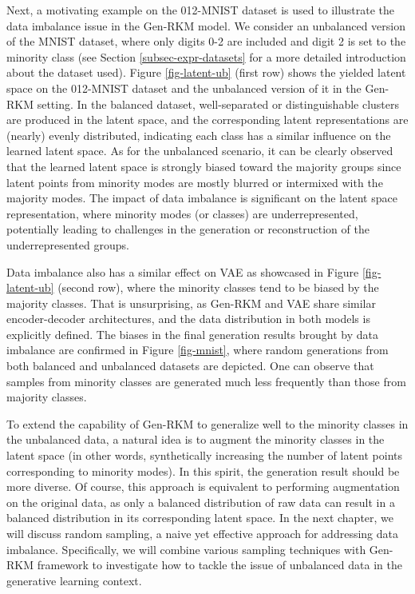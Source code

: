 Next, a motivating example on the 012-MNIST dataset is used to illustrate the data imbalance issue in the Gen-RKM model. We consider an unbalanced version of the MNIST dataset, where only digits 0-2 are included and digit 2 is set to the minority class (see Section \ref{subsec-expr-datasets} for a more detailed introduction about the dataset used). Figure \ref{fig-latent-ub} (first row) shows the yielded latent space on the 012-MNIST dataset and the unbalanced version of it in the Gen-RKM setting. In the balanced dataset, well-separated or distinguishable clusters are produced in the latent space, and the corresponding latent representations are (nearly) evenly distributed, indicating each class has a similar influence on the learned latent space. As for the unbalanced scenario, it can be clearly observed that the learned latent space is strongly biased toward the majority groups since latent points from minority modes are mostly blurred or intermixed with the majority modes. The impact of data imbalance is significant on the latent space representation, where minority modes (or classes) are underrepresented, potentially leading to challenges in the generation or reconstruction of the underrepresented groups.

Data imbalance also has a similar effect on VAE as showcased in Figure \ref{fig-latent-ub} (second row), where the minority classes tend to be biased by the majority classes. That is unsurprising, as Gen-RKM and VAE share similar encoder-decoder architectures, and the data distribution in both models is explicitly defined. The biases in the final generation results brought by data imbalance are confirmed in Figure \ref{fig-mnist}, where random generations from both balanced and unbalanced datasets are depicted. One can observe that samples from minority classes are generated much less frequently than those from majority classes.

To extend the capability of Gen-RKM to generalize well to the minority classes in the unbalanced data, a natural idea is to augment the minority classes in the latent space (in other words, synthetically increasing the number of latent points corresponding to minority modes). In this spirit, the generation result should be more diverse. Of course, this approach is equivalent to performing augmentation on the original data, as only a balanced distribution of raw data can result in a balanced distribution in its corresponding latent space. In the next chapter, we will discuss random sampling, a naive yet effective approach for addressing data imbalance. Specifically, we will combine various sampling techniques with Gen-RKM  framework to investigate how to tackle the issue of unbalanced data in the generative learning context.

